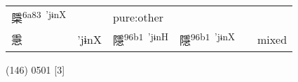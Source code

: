 \documentclass[14pt,a4paper]{scrartcl}
\begin{document}
\begin{longtable}[c]{@{}llllll@{}}
\begin{minipage}[t]{0.14\columnwidth}\raggedright\strut
檃\textsuperscript{6a83~'jɨnX}
\strut\end{minipage} &
\begin{minipage}[t]{0.14\columnwidth}\raggedright\strut
\strut\end{minipage} &
\begin{minipage}[t]{0.14\columnwidth}\raggedright\strut
pure:other
\strut\end{minipage}\tabularnewline
\begin{minipage}[t]{0.14\columnwidth}\raggedright\strut
㥯
\strut\end{minipage} &
\begin{minipage}[t]{0.14\columnwidth}\raggedright\strut
'jɨnX
\strut\end{minipage} &
\begin{minipage}[t]{0.14\columnwidth}\raggedright\strut
隱\textsuperscript{96b1~'jɨnH}
\strut\end{minipage} &
\begin{minipage}[t]{0.14\columnwidth}\raggedright\strut
隱\textsuperscript{96b1~'jɨnX}
\strut\end{minipage} &
\begin{minipage}[t]{0.14\columnwidth}\raggedright\strut
\strut\end{minipage} &
\begin{minipage}[t]{0.14\columnwidth}\raggedright\strut
mixed
\strut\end{minipage}\tabularnewline
\bottomrule
\end{longtable}

(146) 0501 {[}3{]}
\end{document}
